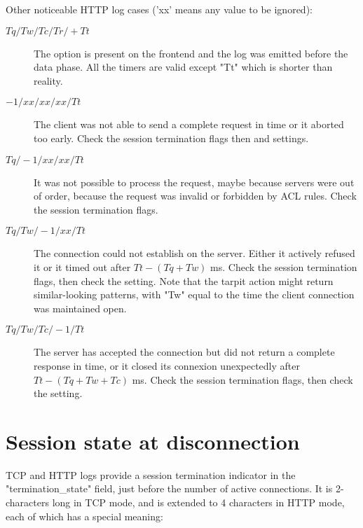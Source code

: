 Other noticeable HTTP log cases ('xx' means any value to be ignored):

\begin{description}
\item[$Tq/Tw/Tc/Tr/+Tt$]
                   The option  is present on the frontend and the log
                   was emitted before the data phase. All the timers are valid
                   except "Tt" which is shorter than reality.

\item[$-1/xx/xx/xx/Tt$]
                   The client was not able to send a complete request in time
                   or it aborted too early. Check the session termination flags
                   then  and  settings.

\item[$Tq/-1/xx/xx/Tt$]
                   It was not possible to process the request, maybe because
                   servers were out of order, because the request was invalid
                   or forbidden by ACL rules. Check the session termination
                   flags.

\item[$Tq/Tw/-1/xx/Tt$]
                   The connection could not establish on the server. Either it
                   actively refused it or it timed out after $Tt-(Tq+Tw)$ ms.
                   Check the session termination flags, then check the
                    setting. Note that the tarpit action might
                   return similar-looking patterns, with "Tw" equal to the time
                   the client connection was maintained open.

\item[$Tq/Tw/Tc/-1/Tt$]
                   The server has accepted the connection but did not return
                   a complete response in time, or it closed its connexion
                   unexpectedly after $Tt-(Tq+Tw+Tc)$ ms. Check the session
                   termination flags, then check the  setting.
\end{description}

\section{Session state at disconnection}
\label{sec:session_state_at_disconnection}

TCP and HTTP logs provide a session termination indicator in the
"termination\_state" field, just before the number of active connections. It is
2-characters long in TCP mode, and is extended to 4 characters in HTTP mode,
each of which has a special meaning:

